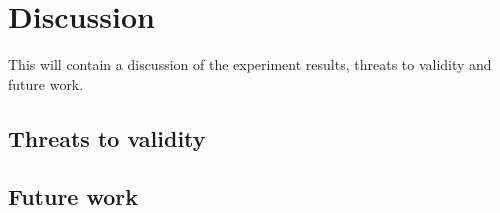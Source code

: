 \chapter{Discussion}

This will contain a discussion of the experiment results, threats to validity and future work.

\nlipsum


\section{Threats to validity}
\nlipsum

\section{Future work}
\nlipsum
